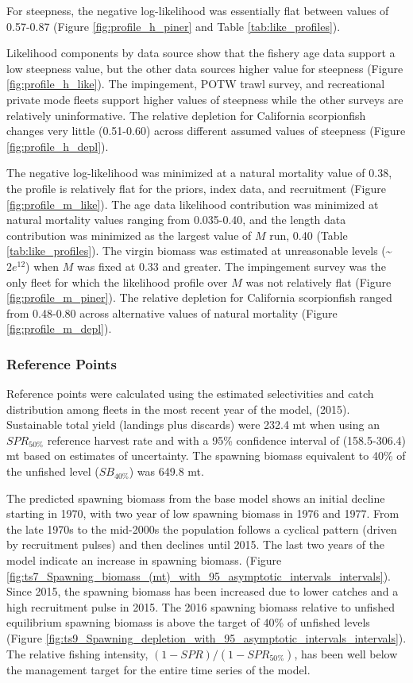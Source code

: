 \documentclass[12pt,]{article}
\begin{document}
For steepness, the negative log-likelihood was essentially flat between
values of 0.57-0.87 (Figure \ref{fig:profile_h_piner} and Table
\ref{tab:like_profiles}).

Likelihood components by data source show that the fishery age data
support a low steepness value, but the other data sources higher value
for steepness (Figure \ref{fig:profile_h_like}). The impingement, POTW
trawl survey, and recreational private mode fleets support higher values
of steepness while the other surveys are relatively uninformative. The
relative depletion for California scorpionfish changes very little
(0.51-0.60) across different assumed values of steepness (Figure
\ref{fig:profile_h_depl}).

The negative log-likelihood was minimized at a natural mortality value
of 0.38, the profile is relatively flat for the priors, index data, and
recruitment (Figure \ref{fig:profile_m_like}). The age data likelihood
contribution was minimized at natural mortality values ranging from
0.035-0.40, and the length data contribution was minimized as the
largest value of \(M\) run, 0.40 (Table \ref{tab:like_profiles}). The
virgin biomass was estimated at unreasonable levels
(\textasciitilde{}\(2e^{12}\)) when \(M\) was fixed at 0.33 and greater.
The impingement survey was the only fleet for which the likelihood
profile over \(M\) was not relatively flat (Figure
\ref{fig:profile_m_piner}). The relative depletion for California
scorpionfish ranged from 0.48-0.80 across alternative values of natural
mortality (Figure \ref{fig:profile_m_depl}).

\subsubsection{Reference Points}\label{reference-points-1}

Reference points were calculated using the estimated selectivities and
catch distribution among fleets in the most recent year of the model,
(2015). Sustainable total yield (landings plus discards) were 232.4 mt
when using an \(SPR_{50\%}\) reference harvest rate and with a 95\%
confidence interval of (158.5-306.4) mt based on estimates of
uncertainty. The spawning biomass equivalent to 40\% of the unfished
level (\(SB_{40\%}\)) was 649.8 mt.

The predicted spawning biomass from the base model shows an initial
decline starting in 1970, with two year of low spawning biomass in 1976
and 1977. From the late 1970s to the mid-2000s the population follows a
cyclical pattern (driven by recruitment pulses) and then declines until
2015. The last two years of the model indicate an increase in spawning
biomass. (Figure
\ref{fig:ts7_Spawning_biomass_(mt)_with_95_asymptotic_intervals_intervals}).
Since 2015, the spawning biomass has been increased due to lower catches
and a high recruitment pulse in 2015. The 2016 spawning biomass relative
to unfished equilibrium spawning biomass is above the target of 40\% of
unfished levels (Figure
\ref{fig:ts9_Spawning_depletion_with_95_asymptotic_intervals_intervals}).
The relative fishing intensity, \((1-SPR)/(1-SPR_{50\%})\), has been
well below the management target for the entire time series of the
model.
\end{document}
